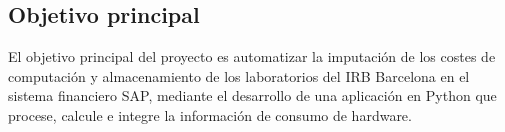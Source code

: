 \subsection{Objetivo principal}
El objetivo principal del proyecto es automatizar la imputación de los costes de computación y 
almacenamiento de los laboratorios del IRB Barcelona en el sistema financiero SAP, mediante el 
desarrollo de una aplicación en Python que procese, calcule e integre la información de consumo de hardware.